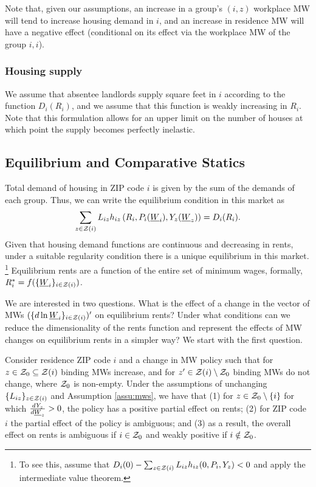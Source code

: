 Note that, given our assumptions, an increase in a group's $(i,z)$ workplace MW 
will tend to increase housing demand in $i$, and an increase in residence MW
will have a negative effect (conditional on its effect via the workplace MW
of the group $i,i$).


\subsubsection*{Housing supply}

We assume that absentee landlords supply square feet in $i$ according to the 
function $D_i(R_i)$,
and we assume that this function is weakly increasing in $R_i$.
Note that this formulation allows for an upper limit on the number of houses at 
which point the supply becomes perfectly inelastic.

\subsection{Equilibrium and Comparative Statics}

Total demand of housing in ZIP code $i$ is given by the sum of the demands of 
each group.
Thus, we can write the equilibrium condition in this market as
\begin{equation}\label{eq:equilibrium}
	\sum_{z\in\mathcal{Z}(i)} L_{iz} h_{iz} \left(R_i, P_i(\underline{W}_i), Y_z(\underline{W}_z)\right) = D_i(R_i) .
\end{equation}
Given that housing demand functions are continuous and decreasing in rents, 
under a suitable regularity condition there is a unique equilibrium in this market.%
\footnote{To see this, assume that 
$D_i(0) - \sum_{z\in\mathcal{Z}(i)} L_{iz} h_{iz} (0, P_i, Y_z) < 0$
and apply the intermediate value theorem.}
Equilibrium rents are a function of the entire set of minimum wages, formally, 
$R^*_i = f(\{\underline{W}_i\}_{i\in\mathcal{Z}(i)})$.

We are interested in two questions.
What is the effect of a change in the vector of MWs $(\{d \ln \underline{W}_i\}_{i\in\mathcal{Z}(i)})'$
on equilibrium rents?
Under what conditions can we reduce the dimensionality of the rents function and 
represent the effects of MW changes on equilibrium rents in a simpler way?
We start with the first question.

\begin{prop}\label{prop:comparative_statics}
    Consider residence ZIP code $i$ and a change in MW policy such that 
    for $z\in\mathcal{Z}_0 \subseteq \mathcal{Z}(i)$ binding MWs increase, 
    and for $z'\in\mathcal{Z}(i)\setminus \mathcal{Z}_0$ binding MWs do not change,
    where $\mathcal{Z}_0$ is non-empty.
    Under the assumptions of unchanging $\{L_{iz}\}_{z\in\mathcal{Z}(i)}$ 
    and Assumption \ref{assu:mws},
    we have that
    (1) for $z\in\mathcal{Z}_0\setminus\{i\}$ for which $\frac{d Y_z}{d \underline{W}_z}>0$, 
    the policy has a positive partial effect on rents;
    (2) for ZIP code $i$ the partial effect of the policy is ambiguous; and
    (3) as a result, the overall effect on rents is ambiguous if $i\in\mathcal{Z}_0$ 
    and weakly positive if $i\notin\mathcal{Z}_0$.
\end{prop}

